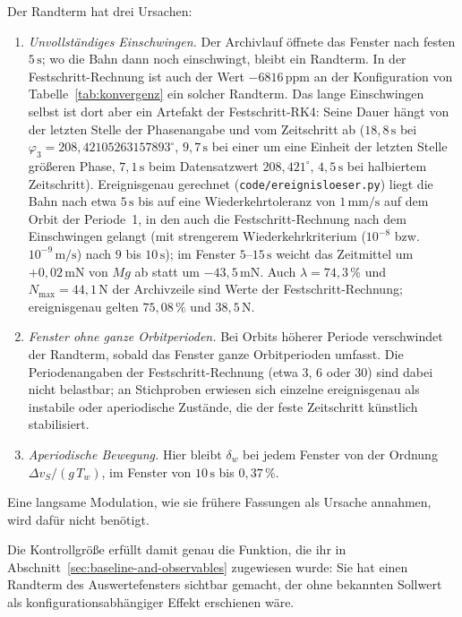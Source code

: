 \documentclass[12pt,a4paper]{report}
\begin{document}
Der Randterm hat drei Ursachen:

\begin{enumerate}
  \item \emph{Unvollständiges Einschwingen.} Der Archivlauf öffnete das
  Fenster nach festen $5\,\mathrm{s}$; wo die Bahn dann noch einschwingt,
  bleibt ein Randterm. In der Festschritt-Rechnung ist auch der Wert
  $-6816\,\mathrm{ppm}$ an der Konfiguration von
  Tabelle~\ref{tab:konvergenz} ein solcher Randterm. Das lange
  Einschwingen selbst ist dort aber ein Artefakt der Festschritt-RK4: Seine
  Dauer hängt von der letzten Stelle der Phasenangabe und vom Zeitschritt
  ab ($18{,}8\,\mathrm{s}$ bei $\varphi_3 = 208{,}42105263157893^\circ$,
  $9{,}7\,\mathrm{s}$ bei einer um eine Einheit der letzten Stelle größeren
  Phase, $7{,}1\,\mathrm{s}$ beim Datensatzwert $208{,}421^\circ$,
  $4{,}5\,\mathrm{s}$ bei halbiertem Zeitschritt). Ereignisgenau gerechnet
  (\texttt{code/ereignisloeser.py}) liegt die Bahn nach etwa
  $5\,\mathrm{s}$ bis auf eine Wiederkehrtoleranz von $1\,\mathrm{mm/s}$
  auf dem Orbit der Periode~1, in den auch die Festschritt-Rechnung nach
  dem Einschwingen gelangt (mit strengerem Wiederkehrkriterium
  ($10^{-8}$ bzw. $10^{-9}\,\mathrm{m/s}$) nach $9$ bis $10\,\mathrm{s}$); im Fenster
  $5$--$15\,\mathrm{s}$ weicht das Zeitmittel um $+0{,}02\,\mathrm{mN}$
  von $Mg$ ab statt um $-43{,}5\,\mathrm{mN}$. Auch $\lambda = 74{,}3\,\%$
  und $N_{\max} = 44{,}1\,\mathrm{N}$ der Archivzeile sind Werte der
  Festschritt-Rechnung; ereignisgenau gelten $75{,}08\,\%$ und
  $38{,}5\,\mathrm{N}$.
  \item \emph{Fenster ohne ganze Orbitperioden.} Bei Orbits höherer
  Periode verschwindet der Randterm, sobald das Fenster ganze
  Orbitperioden umfasst. Die Periodenangaben der Festschritt-Rechnung
  (etwa 3, 6 oder 30) sind dabei nicht belastbar; an Stichproben
  erwiesen sich einzelne ereignisgenau als instabile oder aperiodische
  Zustände, die der feste Zeitschritt künstlich stabilisiert.
  \item \emph{Aperiodische Bewegung.} Hier bleibt $\delta_w$ bei jedem
  Fenster von der Ordnung $\Delta v_S/(g\,T_w)$, im Fenster von
  $10\,\mathrm{s}$ bis $0{,}37\,\%$.
\end{enumerate}

Eine langsame Modulation, wie sie frühere Fassungen als Ursache
annahmen, wird dafür nicht benötigt.

Die Kontrollgröße erfüllt damit genau die Funktion, die ihr in
Abschnitt~\ref{sec:baseline-and-observables} zugewiesen wurde: Sie hat einen Randterm des Auswertefensters sichtbar gemacht, der ohne bekannten
Sollwert als konfigurationsabhängiger Effekt erschienen wäre.
\end{document}
